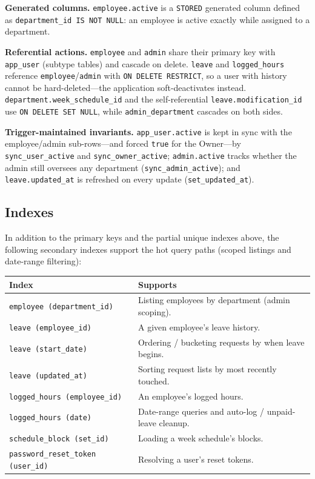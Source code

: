 \documentclass[11pt,a4paper]{article}
\begin{document}
\textbf{Generated columns.} \texttt{employee.active} is a \texttt{STORED} generated column defined as
\texttt{department\_id IS NOT NULL}: an employee is active exactly while assigned to a department.

\textbf{Referential actions.} \texttt{employee} and \texttt{admin} share their primary key with
\texttt{app\_user} (subtype tables) and cascade on delete. \texttt{leave} and \texttt{logged\_hours}
reference \texttt{employee}/\texttt{admin} with \texttt{ON DELETE RESTRICT}, so a user with history
cannot be hard-deleted---the application soft-deactivates instead. \texttt{department.week\_schedule\_id}
and the self-referential \texttt{leave.modification\_id} use \texttt{ON DELETE SET NULL}, while
\texttt{admin\_department} cascades on both sides.

\textbf{Trigger-maintained invariants.} \texttt{app\_user.active} is kept in sync with the
employee/admin sub-rows---and forced \texttt{true} for the Owner---by \texttt{sync\_user\_active} and
\texttt{sync\_owner\_active}; \texttt{admin.active} tracks whether the admin still oversees any
department (\texttt{sync\_admin\_active}); and \texttt{leave.updated\_at} is refreshed on every update
(\texttt{set\_updated\_at}).

\subsection{Indexes}

In addition to the primary keys and the partial unique indexes above, the following secondary indexes
support the hot query paths (scoped listings and date-range filtering):

\begin{longtable}{p{6cm} p{7.5cm}}
\toprule
\textbf{Index} & \textbf{Supports} \\
\midrule
\endhead
\texttt{employee\,(department\_id)} & Listing employees by department (admin scoping). \\
\texttt{leave\,(employee\_id)} & A given employee's leave history. \\
\texttt{leave\,(start\_date)} & Ordering / bucketing requests by when leave begins. \\
\texttt{leave\,(updated\_at)} & Sorting request lists by most recently touched. \\
\texttt{logged\_hours\,(employee\_id)} & An employee's logged hours. \\
\texttt{logged\_hours\,(date)} & Date-range queries and auto-log / unpaid-leave cleanup. \\
\texttt{schedule\_block\,(set\_id)} & Loading a week schedule's blocks. \\
\texttt{password\_reset\_token\,(user\_id)} & Resolving a user's reset tokens. \\
\bottomrule
\end{longtable}
\end{document}
